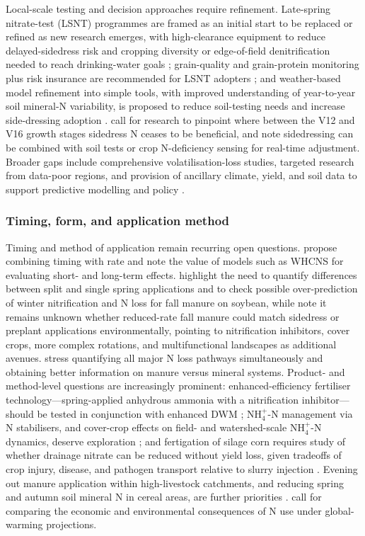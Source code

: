 Local-scale testing and decision approaches require refinement. Late-spring nitrate-test (LSNT) programmes are framed as an initial start to be replaced or refined as new research emerges, with high-clearance equipment to reduce delayed-sidedress risk and cropping diversity or edge-of-field denitrification needed to reach drinking-water goals \parencite{Jaynes2004}; grain-quality and grain-protein monitoring plus risk insurance are recommended for LSNT adopters \parencite{Karlen2005}; and weather-based model refinement into simple tools, with improved understanding of year-to-year soil mineral-N variability, is proposed to reduce soil-testing needs and increase side-dressing adoption \parencite{Malone2010}. \textcite{Jaynes2013} call for research to pinpoint where between the V12 and V16 growth stages sidedress N ceases to be beneficial, and \textcite{Jaynes2015} note sidedressing can be combined with soil tests or crop N-deficiency sensing for real-time adjustment. Broader gaps include comprehensive volatilisation-loss studies, targeted research from data-poor regions, and provision of ancillary climate, yield, and soil data to support predictive modelling and policy \parencite{Chatterjee2020b}.

\subsubsection{Timing, form, and application method}

Timing and method of application remain recurring open questions. \textcite{Liang2018} propose combining timing with rate and note the value of models such as WHCNS for evaluating short- and long-term effects. \textcite{Malone2007b} highlight the need to quantify differences between split and single spring applications and to check possible over-prediction of winter nitrification and N loss for fall manure on soybean, while \textcite{HernandezRamirez2011} note it remains unknown whether reduced-rate fall manure could match sidedress or preplant applications environmentally, pointing to nitrification inhibitors, cover crops, more complex rotations, and multifunctional landscapes as additional avenues. \textcite{Elmi2005} stress quantifying all major N loss pathways simultaneously and obtaining better information on manure versus mineral systems. Product- and method-level questions are increasingly prominent: enhanced-efficiency fertiliser technology---spring-applied anhydrous ammonia with a nitrification inhibitor---should be tested in conjunction with enhanced DWM \parencite{Kaur2024c}; NH$_4^+$-N management via N stabilisers, and cover-crop effects on field- and watershed-scale NH$_4^+$-N dynamics, deserve exploration \parencite{Vincent2025}; and fertigation of silage corn requires study of whether drainage nitrate can be reduced without yield loss, given tradeoffs of crop injury, disease, and pathogen transport relative to slurry injection \parencite{Gamble2018}. Evening out manure application within high-livestock catchments, and reducing spring and autumn soil mineral N in cereal areas, are further priorities \parencite{Bechmann2014}. \textcite{Haghnazari2020} call for comparing the economic and environmental consequences of N use under global-warming projections.


